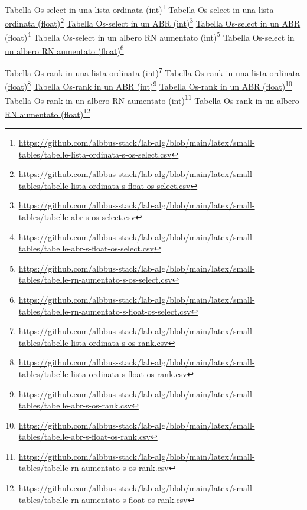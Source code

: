 \documentclass[onecolumn]{article}
\newcommand\anchor[2]{%
  \href{#2}{#1}\footnote{\url{#2}}%
}
\begin{document}
\noindent
\anchor{Tabella Os-select in una lista ordinata (int)}{https://github.com/albbus-stack/lab-alg/blob/main/latex/small-tables/tabelle-lista-ordinata-s-os-select.csv} \label{label:lista-ordinata-s-os-select}
\newline
\anchor{Tabella Os-select in una lista ordinata (float)}{https://github.com/albbus-stack/lab-alg/blob/main/latex/small-tables/tabelle-lista-ordinata-s-float-os-select.csv} \label{label:lista-ordinata-s-float-os-select}
\newline
\anchor{Tabella Os-select in un ABR (int)}{https://github.com/albbus-stack/lab-alg/blob/main/latex/small-tables/tabelle-abr-s-os-select.csv} \label{label:abr-s-os-select}
\newline
\anchor{Tabella Os-select in un ABR (float)}{https://github.com/albbus-stack/lab-alg/blob/main/latex/small-tables/tabelle-abr-s-float-os-select.csv} \label{label:abr-s-float-os-select}
\newline
\anchor{Tabella Os-select in un albero RN aumentato (int)}{https://github.com/albbus-stack/lab-alg/blob/main/latex/small-tables/tabelle-rn-aumentato-s-os-select.csv} \label{label:rn-aumentato-s-os-select}
\newline
\anchor{Tabella Os-select in un albero RN aumentato (float)}{https://github.com/albbus-stack/lab-alg/blob/main/latex/small-tables/tabelle-rn-aumentato-s-float-os-select.csv} \label{label:rn-aumentato-s-float-os-select}

\newpage

\noindent
\anchor{Tabella Os-rank in una lista ordinata (int)}{https://github.com/albbus-stack/lab-alg/blob/main/latex/small-tables/tabelle-lista-ordinata-s-os-rank.csv} \label{label:lista-ordinata-s-os-rank}
\newline
\anchor{Tabella Os-rank in una lista ordinata (float)}{https://github.com/albbus-stack/lab-alg/blob/main/latex/small-tables/tabelle-lista-ordinata-s-float-os-rank.csv} \label{label:lista-ordinata-s-float-os-rank}
\newline
\anchor{Tabella Os-rank in un ABR (int)}{https://github.com/albbus-stack/lab-alg/blob/main/latex/small-tables/tabelle-abr-s-os-rank.csv} \label{label:abr-s-os-rank}
\newline
\anchor{Tabella Os-rank in un ABR (float)}{https://github.com/albbus-stack/lab-alg/blob/main/latex/small-tables/tabelle-abr-s-float-os-rank.csv} \label{label:abr-s-float-os-rank}
\newline
\anchor{Tabella Os-rank in un albero RN aumentato (int)}{https://github.com/albbus-stack/lab-alg/blob/main/latex/small-tables/tabelle-rn-aumentato-s-os-rank.csv} \label{label:rn-aumentato-s-os-rank}
\newline
\anchor{Tabella Os-rank in un albero RN aumentato (float)}{https://github.com/albbus-stack/lab-alg/blob/main/latex/small-tables/tabelle-rn-aumentato-s-float-os-rank.csv} \label{label:rn-aumentato-s-float-os-rank}
\end{document}
